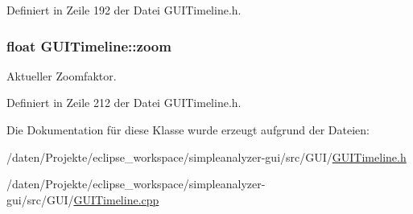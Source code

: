 Definiert in Zeile 192 der Datei G\-U\-I\-Timeline.\-h.

\hypertarget{classGUITimeline_a9b5b63103a41b6e661cfb30acfcda448}{
\subsubsection[{zoom}]{\setlength{\rightskip}{0pt plus 5cm}float G\-U\-I\-Timeline\-::zoom\hspace{0.3cm}{\ttfamily [private]}}}\label{classGUITimeline_a9b5b63103a41b6e661cfb30acfcda448}


Aktueller Zoomfaktor. 



Definiert in Zeile 212 der Datei G\-U\-I\-Timeline.\-h.



Die Dokumentation für diese Klasse wurde erzeugt aufgrund der Dateien\-:\begin{DoxyCompactItemize}
\item 
/daten/\-Projekte/eclipse\-\_\-workspace/simpleanalyzer-\/gui/src/\-G\-U\-I/\hyperlink{GUITimeline_8h}{G\-U\-I\-Timeline.\-h}\item 
/daten/\-Projekte/eclipse\-\_\-workspace/simpleanalyzer-\/gui/src/\-G\-U\-I/\hyperlink{GUITimeline_8cpp}{G\-U\-I\-Timeline.\-cpp}\end{DoxyCompactItemize}
